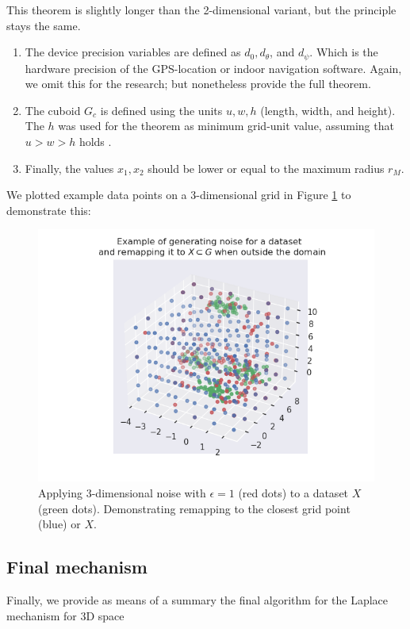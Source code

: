 This theorem is slightly longer than the 2-dimensional variant, but the principle stays the same.
\begin{enumerate}
  \item The device precision variables are defined as $d_0, d_\theta$, and $d_\psi$. Which is the hardware precision of the GPS-location or indoor navigation software.  Again, we omit this for the research; but nonetheless provide the full theorem.
  \item The cuboid $G_c$ is defined using the units $u, w, h$ (length, width, and height). The $h$ was used for the theorem as minimum grid-unit value, assuming that $u > w > h$ holds \citep{9646489}.
  \item Finally, the values $x_1, x_2$ should be lower or equal to the maximum radius $r_M$.
\end{enumerate}

We plotted example data points on a 3-dimensional grid in Figure \ref{fig:3d-laplace-example} to demonstrate this:
\begin{figure} [H]
  \includegraphics[width=\textwidth]{TheorethicalFramework/ND-Laplace/Images/example_3d_laplace.png}
  \caption{Applying 3-dimensional noise with $\epsilon = 1$ (red dots) to a dataset $X$ (green dots). Demonstrating remapping to the closest grid point (blue) or $X$.}
  \label{fig:3d-laplace-example}
\end{figure}

\newpage
\subsection{Final mechanism}
Finally, we provide as means of a summary the final algorithm for the Laplace mechanism for 3D space

\newpage